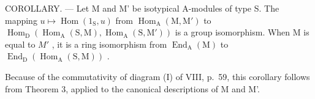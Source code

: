 COROLLARY. --- Let M and M' be isotypical A-modules of type S. The mapping \(u \mapsto \operatorname{Hom}(1_{\mathrm{S}}, u)\) from \(\operatorname{Hom}_{\mathrm{A}}(\mathrm{M}, \mathrm{M}')\) to \(\operatorname{Hom}_{\mathrm{D}}(\operatorname{Hom}_{\mathrm{A}}(\mathrm{S}, \mathrm{M}), \operatorname{Hom}_{\mathrm{A}}(\mathrm{S}, \mathrm{M}'))\) is a group isomorphism. When M is equal to \(M'\) , it is a ring isomorphism from \(\operatorname{End}_{\mathrm{A}}(\mathrm{M})\) to \(\operatorname{End}_{\mathrm{D}}(\operatorname{Hom}_{\mathrm{A}}(\mathrm{S}, \mathrm{M}))\) .

Because of the commutativity of diagram (I) of VIII, p.~59, this corollary follows from Theorem 3, applied to the canonical descriptions of M and M'.
